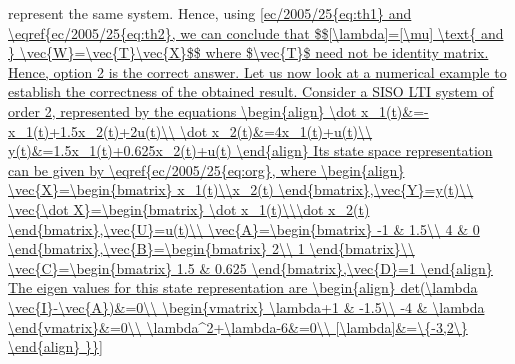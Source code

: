 represent the same system. Hence, using \eqref{ec/2005/25{eq:th1} and \eqref{ec/2005/25{eq:th2}, we can conclude that
$$[\lambda]=[\mu] \text{ and } \vec{W}=\vec{T}\vec{X}$$
where $\vec{T}$ need not be identity matrix.


Hence, option 2 is the correct answer.


Let us now look at a numerical example to establish the correctness of the obtained result. Consider a SISO LTI system of order 2, represented by the equations
\begin{align}
    \dot x_1(t)&=-x_1(t)+1.5x_2(t)+2u(t)\\
    \dot x_2(t)&=4x_1(t)+u(t)\\
    y(t)&=1.5x_1(t)+0.625x_2(t)+u(t)
\end{align}
Its state space representation can be given by \eqref{ec/2005/25{eq:org}, where
\begin{align}
    \vec{X}=\begin{bmatrix}
    x_1(t)\\x_2(t)
    \end{bmatrix},\vec{Y}=y(t)\\
    \vec{\dot X}=\begin{bmatrix}
    \dot x_1(t)\\\dot x_2(t)
    \end{bmatrix},\vec{U}=u(t)\\
    \vec{A}=\begin{bmatrix}
    -1 & 1.5\\
    4 & 0
    \end{bmatrix},\vec{B}=\begin{bmatrix}
    2\\
    1
    \end{bmatrix}\\
    \vec{C}=\begin{bmatrix}
    1.5 & 0.625
    \end{bmatrix},\vec{D}=1
\end{align}
The eigen values for this state representation are
\begin{align}
    det(\lambda \vec{I}-\vec{A})&=0\\
    \begin{vmatrix}
    \lambda+1 & -1.5\\
    -4 & \lambda
    \end{vmatrix}&=0\\
    \lambda^2+\lambda-6&=0\\
    [\lambda]&=\{-3,2\}
\end{align}
}}}
